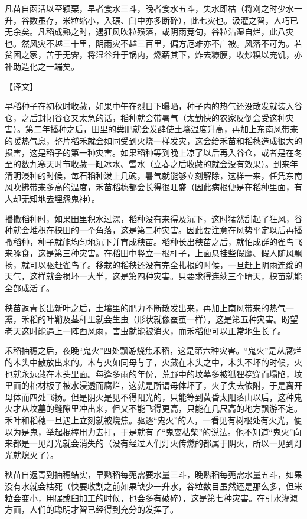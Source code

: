 \documentclass[12pt,UTF8]{ctexbook}
\begin{document}
凡苗自函活以至颖栗，早者食水三斗，晚者食水五斗，失水即枯（将刈之时少水一升，谷数虽存，米粒缩小，入碾、臼中亦多断碎），此七灾也。汲灌之智，人巧已无余矣。凡稻成熟之时，遇狂风吹粒殒落，或阴雨竞旬，谷粒沾湿自烂，此八灾也。然风灾不越三十里，阴雨灾不越三百里，偏方厄难亦不广被。风落不可为。若贫困之家，苦于无霁，将湿谷升于锅内，燃薪其下，炸去糠膜，收炒糗以充饥，亦补助造化之一端矣。

【译文】

早稻种子在初秋时收藏，如果中午在烈日下曝晒，种子内的热气还没散发就装入谷仓，之后封闭谷仓又太急的话，稻种就会带暑气（太勤快的农家反倒会受这种灾害）。第二年播种之后，田里的粪肥就会发酵使土壤温度升高，再加上东南风带来的暖热气息，整片稻禾就会如同受到火烧一样发灾，这会给禾苗和稻穗造成很大的损害，这是稻子的第一种灾害。如果稻种等到晚上凉了以后再入谷仓，或者是在冬至的数九寒天时节收藏一缸冰水、雪水（立春之后收藏的就会没有效果）。到来年清明浸种的时候，每石稻种泼上几碗，暑气就能够立刻解除，这样一来，任凭东南风吹拂带来多高的温度，禾苗稻穗都会长得很旺盛（因此病根便是在稻种里面，有人却无知地去埋怨鬼神）。

播撒稻种时，如果田里积水过深，稻种没有来得及沉下，这时猛然刮起了狂风，谷种就会堆积在秧田的一个角落，这是第二种灾害。因此要注意在风势平定以后再播撒稻种，种子就能均匀地沉下并育成秧苗。稻种长出秧苗之后，就怕成群的雀鸟飞来啄食，这是第三种灾害。在稻田中竖立一根杆子，上面悬挂些假鹰、假人随风飘扬，就可以驱赶雀鸟了。移栽的稻秧还没有完全扎根的时候，一旦赶上阴雨连绵的天气，这样就会损坏一大半，这是第四种灾害。只要求得连续三个晴天，秧苗就能全部成活了。

秧苗返青长出新叶之后，土壤里的肥力不断散发出来，再加上南风带来的热气一熏，禾稻的叶鞘及茎秆里就会生虫（形状就像蚕茧一样），这是第五种灾害。盼望老天这时能遇上一阵西风雨，害虫就能被消灭，而禾稻便可以正常地生长了。

禾稻抽穗之后，夜晚“鬼火”四处飘游烧焦禾稻，这是第六种灾害。“鬼火”是从腐烂的木头中散放出来的。木与火如同母与子，火藏在木头之中，木头不坏的时候，火也就永远藏在木头里面。每逢多雨的年份，荒野中的坟墓多被狐狸挖穿而塌陷，坟里面的棺材板子被水浸透而腐烂，这就是所谓母体坏了，火子失去依附，于是离开母体而四处飞扬。但是阴火是见不得阳光的，只能等到黄昏太阳落山以后，这种鬼火才从坟墓的缝隙里冲出来，但又不能飞得更高，只能在几尺高的地方飘游不定。禾叶和稻穗一旦遇上立刻就被烧焦。驱逐“鬼火”的人，一看见有树根处有火光，便以为是鬼，举起棍棒用力去打，于是就有了“鬼变枯柴”的说法。他不知道“鬼火”向来都是一见灯光就会消失的（没有经过人们灯火传燃的都属于阴火，所以一见到灯光就熄灭了）。

秧苗自返青到抽穗结实，早熟稻每蔸需要水量三斗，晚熟稻每蔸需水量五斗，如果没有水就会枯死（快要收割之前如果缺少一升水，谷粒数目虽然还是那么多，但米粒会变小，用碾或臼加工的时候，也会多有破碎），这是第七种灾害。在引水灌溉方面，人们的聪明才智已经得到充分的发挥了。
\end{document}
